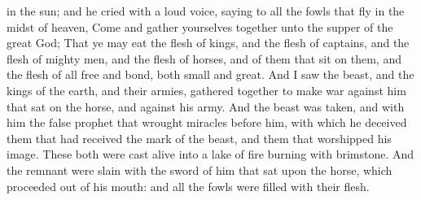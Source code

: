 {in the
sun;
and he
cried with a
loud
voice,
saying to
all the
fowls that
fly
in the midst of
heaven,
Come
and gather yourselves
together
unto the
supper of the
great
God;
That ye may
eat the
flesh of
kings,
and the
flesh of
captains,
and the
flesh of mighty
men,
and the
flesh of
horses,
and of
them that
sit
on
them,
and the
flesh of
all
{}
free
and
bond,
both
small
and
great.
And I
saw the
beast,
and the
kings of the
earth,
and
their
armies, gathered
together to
make
war
against
him that
sat
on the
horse,
and
against
his
army.
And the
beast was
taken,
and
with
him the false
prophet that
wrought
miracles
before
him,
with
which he
deceived
them that had
received the
mark of the
beast,
and
them that
worshipped
his
image. These
both were
cast
alive
into a
lake of
fire
burning
with
brimstone.
And the
remnant were
slain
with the
sword of
him that
sat
upon the
horse,
which
{}
proceeded out
of
his
mouth:
and
all the
fowls were
filled
with
their
flesh.

}
